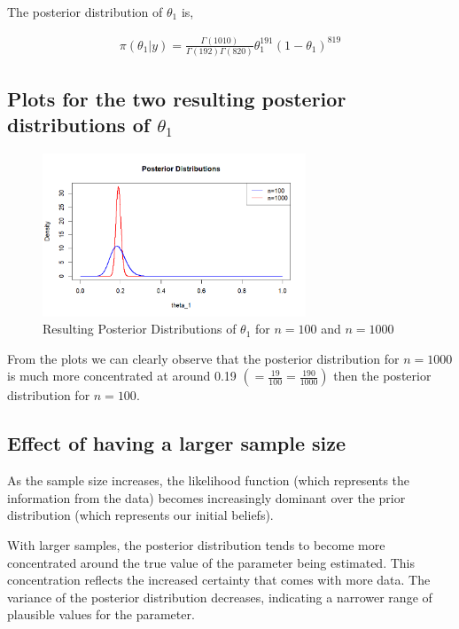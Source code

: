 \documentclass[a4paper]{article}
\begin{document}
The posterior distribution of \(\theta_1\) is,

\begin{align*}
    \pi(\theta_1|y) = \frac{\Gamma(1010)}{\Gamma(192)\Gamma(820)}\theta_1^{191}(1-\theta_1)^{819}
\end{align*}

\subsection*{Plots for the two resulting posterior distributions of \(\theta_1\)}
\begin{figure}[htbp] %
    \centering
    \includegraphics[width=0.7\textwidth]{Posterior_Distribution.png}
    \caption{Resulting Posterior Distributions of \(\theta_1\) for \(n = 100\) and \(n = 1000\)}
    \label{fig:myimage}
\end{figure}

From the plots we can clearly observe that the posterior distribution for \(n = 1000\) is much more concentrated at around 0.19 \( \left(= \frac{19}{100} = \frac{190}{1000}\right)\) then the posterior distribution for \(n=100\).

\subsection*{Effect of having a larger sample size}
As the sample size increases, the likelihood function (which represents the information from the data) becomes increasingly dominant over the prior distribution (which represents our initial beliefs).

With larger samples, the posterior distribution tends to become more concentrated around the true value of the parameter being estimated.
This concentration reflects the increased certainty that comes with more data.
The variance of the posterior distribution decreases, indicating a narrower range of plausible values for the parameter.
\end{document}
